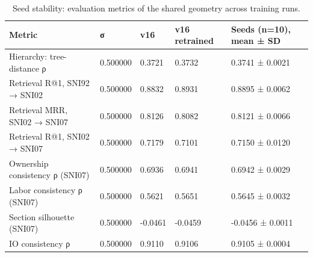 \begin{table}
\caption{Seed stability: evaluation metrics of the shared geometry across training runs.}
\label{tab:seed_stability_geometry}
\begin{tabular}{lllll}
\toprule
Metric & σ & v16 & v16 retrained & Seeds (n=10), mean ± SD \\
\midrule
Hierarchy: tree-distance ρ & 0.500000 & 0.3721 & 0.3732 & 0.3741 ± 0.0021 \\
Retrieval R@1, SNI92 → SNI02 & 0.500000 & 0.8832 & 0.8931 & 0.8895 ± 0.0062 \\
Retrieval MRR, SNI02 → SNI07 & 0.500000 & 0.8126 & 0.8082 & 0.8121 ± 0.0066 \\
Retrieval R@1, SNI02 → SNI07 & 0.500000 & 0.7179 & 0.7101 & 0.7150 ± 0.0120 \\
Ownership consistency ρ (SNI07) & 0.500000 & 0.6936 & 0.6941 & 0.6942 ± 0.0029 \\
Labor consistency ρ (SNI07) & 0.500000 & 0.5621 & 0.5651 & 0.5645 ± 0.0032 \\
Section silhouette (SNI07) & 0.500000 & -0.0461 & -0.0459 & -0.0456 ± 0.0011 \\
IO consistency ρ & 0.500000 & 0.9110 & 0.9106 & 0.9105 ± 0.0004 \\
\bottomrule
\end{tabular}
\end{table}
